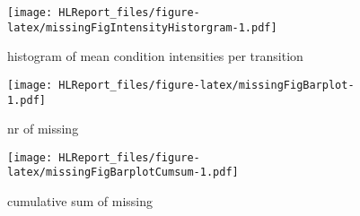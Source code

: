 \documentclass[]{article}
\begin{document}
\begin{figure}
\centering
\texttt{[image: HLReport\_files/figure-latex/missingFigIntensityHistorgram-1.pdf]}
\caption{histogram of mean condition intensities per transition}
\end{figure}

\begin{figure}
\centering
\texttt{[image: HLReport\_files/figure-latex/missingFigBarplot-1.pdf]}
\caption{nr of missing}
\end{figure}

\begin{figure}
\centering
\texttt{[image: HLReport\_files/figure-latex/missingFigBarplotCumsum-1.pdf]}
\caption{cumulative sum of missing}
\end{figure}
\end{document}
